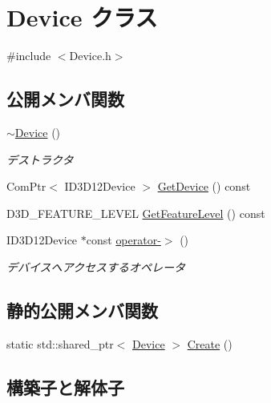 \hypertarget{class_device}{}\section{Device クラス}
\label{class_device}


{\ttfamily \#include $<$Device.\+h$>$}

\subsection*{公開メンバ関数}
\begin{DoxyCompactItemize}
\item 
\mbox{\hyperlink{class_device_a9dabc419c8d8df3a686c33ce042bc99a}{$\sim$\+Device}} ()
\begin{DoxyCompactList}\small\item\em デストラクタ \end{DoxyCompactList}\item 
Com\+Ptr$<$ I\+D3\+D12\+Device $>$ \mbox{\hyperlink{class_device_a254f5a196d646fa7ef108fbe2d7ce8d6}{Get\+Device}} () const
\item 
D3\+D\+\_\+\+F\+E\+A\+T\+U\+R\+E\+\_\+\+L\+E\+V\+EL \mbox{\hyperlink{class_device_af4104295c9c70394b50426f745988d21}{Get\+Feature\+Level}} () const
\item 
I\+D3\+D12\+Device $\ast$const \mbox{\hyperlink{class_device_a9cdad6c4f4eae466f20b80cf6f9934d9}{operator-\/$>$}} ()
\begin{DoxyCompactList}\small\item\em デバイスへアクセスするオペレータ \end{DoxyCompactList}\end{DoxyCompactItemize}
\subsection*{静的公開メンバ関数}
\begin{DoxyCompactItemize}
\item 
static std\+::shared\+\_\+ptr$<$ \mbox{\hyperlink{class_device}{Device}} $>$ \mbox{\hyperlink{class_device_a170367ef9b9851afbc42d004ceba713c}{Create}} ()
\end{DoxyCompactItemize}


\subsection{構築子と解体子}
\mbox{\label{class_device_a9dabc419c8d8df3a686c33ce042bc99a}} 
